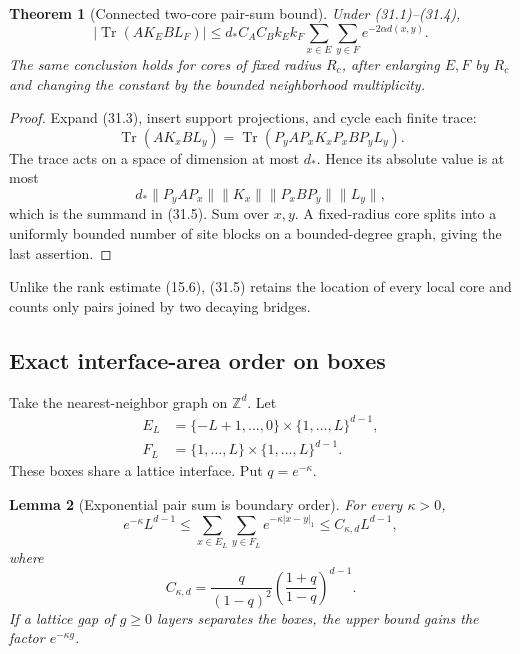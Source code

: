 \documentclass[11pt]{article}
\newtheorem{theorem}{Theorem}[section]
\newtheorem{lemma}[theorem]{Lemma}
\theoremstyle{remark}
\begin{document}
\begin{theorem}[Connected two-core pair-sum bound]
\label{thm:v15v31-pair}
Under (31.1)--(31.4),
\[
 \boxed{
 |\operatorname{Tr}(AK_EBL_F)|
 \le
 d_*C_AC_Bk_Ek_F
 \sum_{x\in E}\sum_{y\in F}
 e^{-2\alpha d(x,y)}.}                                    \tag{31.5}
\]
The same conclusion holds for cores of fixed radius \(R_c\), after
enlarging \(E,F\) by \(R_c\) and changing the constant by the
bounded neighborhood multiplicity.
\end{theorem}

\begin{proof}
Expand (31.3), insert support projections, and cycle each finite
trace:
\[
 \operatorname{Tr}(AK_xBL_y)
 =
 \operatorname{Tr}\left(
 P_yAP_xK_xP_xBP_yL_y
 \right).                                                   \tag{31.6}
\]
The trace acts on a space of dimension at most \(d_*\).  Hence its
absolute value is at most
\[
 d_*
 \|P_yAP_x\|\|K_x\|
 \|P_xBP_y\|\|L_y\|,
\]
which is the summand in (31.5).  Sum over \(x,y\).  A fixed-radius
core splits into a uniformly bounded number of site blocks on a
bounded-degree graph, giving the last assertion.
\end{proof}

Unlike the rank estimate (15.6), (31.5) retains the location of
every local core and counts only pairs joined by two decaying
bridges.

\subsection{Exact interface-area order on boxes}

Take the nearest-neighbor graph on \(\mathbb Z^d\).  Let
\[
\begin{aligned}
 E_L&=\{-L+1,\ldots,0\}\times\{1,\ldots,L\}^{d-1},\\
 F_L&=\{1,\ldots,L\}\times\{1,\ldots,L\}^{d-1}.             \tag{31.7}
\end{aligned}
\]
These boxes share a lattice interface.  Put \(q=e^{-\kappa}\).

\begin{lemma}[Exponential pair sum is boundary order]
\label{lem:v15v31-area}
For every \(\kappa>0\),
\[
 \boxed{
 e^{-\kappa}L^{d-1}
 \le
 \sum_{x\in E_L}\sum_{y\in F_L}e^{-\kappa|x-y|_1}
 \le
 C_{\kappa,d}L^{d-1},}                                    \tag{31.8}
\]
where
\[
 C_{\kappa,d}
 =
 \frac{q}{(1-q)^2}
 \left(\frac{1+q}{1-q}\right)^{d-1}.                       \tag{31.9}
\]
If a lattice gap of \(g\ge0\) layers separates the boxes, the upper
bound gains the factor \(e^{-\kappa g}\).
\end{lemma}
\end{document}
